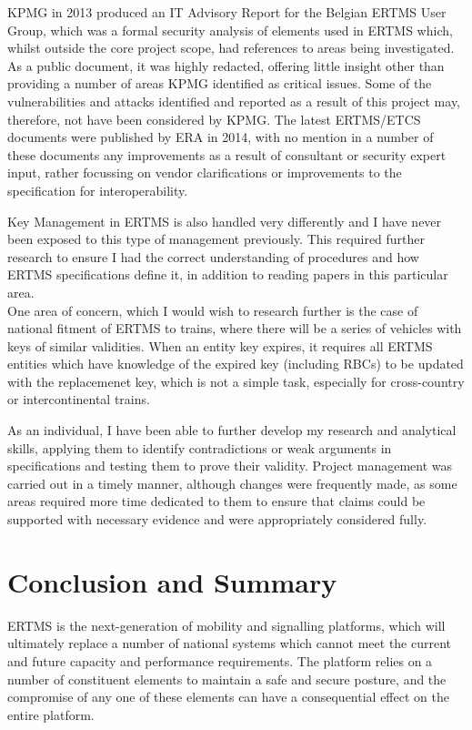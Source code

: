\documentclass[twoside,11pt,a4paper]{article}
\begin{document}
KPMG in 2013 produced an IT Advisory Report \citep{KPMG13a} for the Belgian ERTMS User Group, which was a formal security analysis of elements used in ERTMS which, whilst outside the core project scope, had references to areas being investigated. As a public document, it was highly redacted, offering little insight other than providing a number of areas KPMG identified as critical issues. Some of the vulnerabilities and attacks identified and reported as a result of this project may, therefore, not have been considered by KPMG. The latest ERTMS/ETCS documents were published by ERA in 2014, with no mention in a number of these documents any improvements as a result of consultant or security expert input, rather focussing on vendor clarifications or improvements to the specification for interoperability.

Key Management in ERTMS is also handled very differently and I have never been exposed to this type of management previously. This required further research to ensure I had the correct understanding of procedures and how ERTMS specifications define it, in addition to reading papers in this particular area.\\ One area of concern, which I would wish to research further is the case of national fitment of ERTMS to trains, where there will be a series of vehicles with keys of similar validities. When an entity key expires, it requires all ERTMS entities which have knowledge of the expired key (including RBCs) to be updated with the replacemenet key, which is not a simple task, especially for cross-country or intercontinental trains.

As an individual, I have been able to further develop my research and analytical skills, applying them to identify contradictions or weak arguments in specifications and testing them to prove their validity. Project management was carried out in a timely manner, although changes were frequently made, as some areas required more time dedicated to them to ensure that claims could be supported with necessary evidence and were appropriately considered fully.


\clearpage

\section{Conclusion and Summary}
ERTMS is the next-generation of mobility and signalling platforms, which will ultimately replace a number of national systems which cannot meet the current and future capacity and performance requirements. The platform relies on a number of constituent elements to maintain a safe and secure posture, and the compromise of any one of these elements can have a consequential effect on the entire platform.
\end{document}
